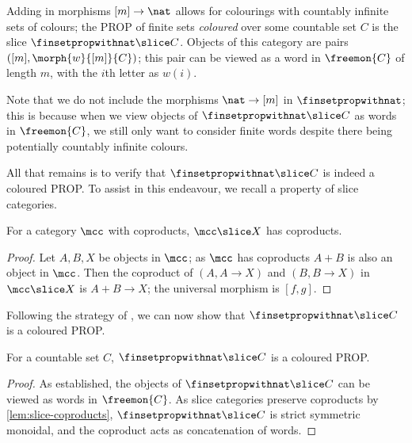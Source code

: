 Adding in morphisms \([m] \to \nat\) allows for colourings with countably
infinite sets of colours; the PROP of finite sets \emph{coloured} over some
countable set \(C\) is the slice \(\finsetpropwithnat \slice C\).
Objects of this category are pairs \(([m], \morph{w}{[m]}{C})\); this pair can
be viewed as a word in \(\freemon{C}\) of length \(m\), with the \(i\)th letter
as \(w(i)\).

\begin{remark}
    Note that we do not include the morphisms \(\nat \to [m]\) in
    \(\finsetpropwithnat\); this is because when we view objects of
    \(\finsetpropwithnat \slice C\) as words in \(\freemon{C}\), we still only
    want to consider finite words despite there being potentially countably
    infinite colours.
\end{remark}

All that remains is to verify that \(\finsetpropwithnat \slice C\) is indeed a
coloured PROP.
To assist in this endeavour, we recall a property of slice categories.

\begin{lemma}
    \label{lem:slice-coproducts}
    For a category \(\mcc\) with coproducts, \(\mcc \slice X\) has coproducts.
\end{lemma}
\begin{proof}
    Let \(A,B,X\) be objects in \(\mcc\); as \(\mcc\) has coproducts \(A + B\)
    is also an object in \(\mcc\).
    Then the coproduct of \((A, A \to X)\) and \((B, B \to X)\) in
    \(\mcc \slice X\) is \(A + B \to X\); the universal morphism is \([f, g]\).
\end{proof}

Following the strategy of \cite[Prop. 2.23]{bonchi2022string}, we can now show
that \(\finsetpropwithnat \slice C\) is a coloured PROP.

\begin{proposition}
    \label{prop:hatfinsetprop-slice-is-coloured-prop}
    For a countable set \(C\), \(\finsetpropwithnat \slice C\) is a
    coloured PROP.
\end{proposition}
\begin{proof}
    As established, the objects of \(\finsetpropwithnat \slice C\) can be viewed
    as words in \(\freemon{C}\).
    As slice categories preserve coproducts by \cref{lem:slice-coproducts},
    \(\finsetpropwithnat \slice C\) is strict symmetric monoidal, and the
    coproduct acts as concatenation of words.
\end{proof}

